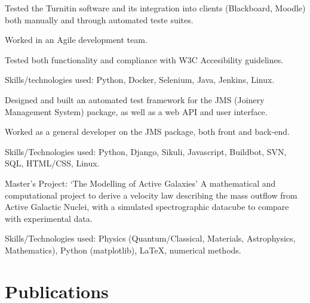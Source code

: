 \documentclass[letterpaper]{deedy-resume-openfont} %
\begin{document}
\begin{minipage}[t]{0.66\textwidth}

\begin{tightemize}
\item Tested the Turnitin software and its integration into clients (Blackboard, Moodle) both manually and through automated teste suites.
\item Worked in an Agile development team.
\item Tested both functionality and compliance with W3C Accesibility guidelines.
\item Skills/technologies used: Python, Docker, Selenium, Java, Jenkins, Linux.
\end{tightemize}

\sectionspace %


\begin{tightemize}
\item Designed and built an automated test framework for the JMS (Joinery Management System) package, as well as a web API and user interface.
\item Worked as a general developer on the JMS package, both front and back-end.
\item Skills/Technologies used: Python, Django, Sikuli, Javascript, Buildbot, SVN, SQL, HTML/CSS, Linux.
\end{tightemize}

\sectionspace %



\begin{tightemize}
\item Master's Project: `The Modelling of Active Galaxies' A mathematical and computational project to derive a velocity law describing the mass outflow from Active Galactic Nuclei, with a simulated spectrographic datacube to compare with experimental data. 
\item Skills/Technologies used: Physics (Quantum/Classical, Materials, Astrophysics, Mathematics), Python (matplotlib), LaTeX, numerical methods.
\end{tightemize}

\section{Publications} 


\end{minipage}
\end{document}
